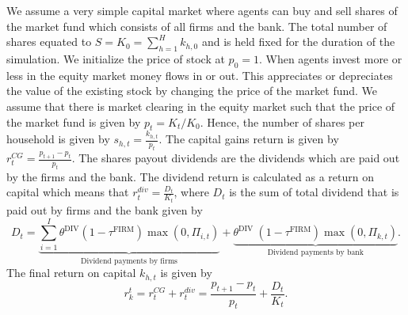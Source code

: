 We assume a very simple capital market where agents can buy and sell shares of the market fund which consists of all firms and the bank. The total number of shares equated to $S = K_0 = \sum_{h=1}^H k_{h,0}$ and is held fixed for the duration of the simulation. We initialize the price of stock at $p_0=1$. When agents invest more or less in the equity market money flows in or out. This appreciates or depreciates the value of the existing stock by changing the price of the market fund. We assume that there is market clearing in the equity market such that the price of the market fund is given by $p_t = K_t / K_0.$ Hence, the number of shares per household is given by $s_{h,t} = \frac{k_{h,t}}{p_t}$. The capital gains return is given by $r^{CG}_t = \frac{p_{t+1}-p_{t}}{p_{t}}$.
The shares payout dividends are the dividends which are paid out by the firms and the bank. The dividend return is calculated as a return on capital which means that $r^{div}_t = \frac{D_t}{K_t}$, where $D_t$ is the sum of total dividend that is paid out by firms and the bank given by \begin{equation*}
    D_t = \underbrace{\sum_{i=1}^I\theta^{\mathrm{DIV}}\left(1-\tau^{\mathrm{FIRM}}\right) \max \left(0, \Pi_{i,t}\right)}_{\text {Dividend payments by firms}} + \underbrace{\theta^{\text {DIV }}\left(1-\tau^{\mathrm{FIRM}}\right) \max \left(0, \Pi_{k,t}\right)}_{\text {Dividend payments by bank}}.
\end{equation*}
The final return on capital $k_{h,t}$ is given by 
\begin{equation}
    r_k^t = r^{CG}_t + r^{div}_t =  \frac{p_{t+1}-p_{t}}{p_{t}} + \frac{D_t}{K_t}.
\end{equation}
